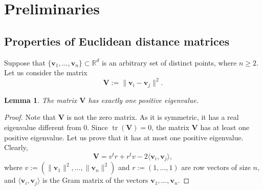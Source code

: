 \documentclass[a4paper, oneside, reqno, 12pt]{amsart}
\theoremstyle{plain}
\newtheorem{lemma}[theorem]{Lemma}
\theoremstyle{definition}
\DeclareMathOperator{\tr}{tr}
\begin{document}
\section{Preliminaries}
\label{section:preliminaries}
\subsection{Properties of Euclidean distance matrices}
Suppose that $\{\mathbf v_1, \dots, \mathbf v_n\}\subset \mathbb R^d$ is an arbitrary set of distinct points, where $n\geq 2$. Let us consider the matrix 
\[
\mathbf V:=\|\mathbf v_i-\mathbf v_j\|^2.
\]
\begin{lemma} \label{lemma:matrixV}
The matrix $\mathbf V$ has exactly one positive eigenvalue.
\end{lemma}
\begin{proof}
Note that $\mathbf V$ is not the zero matrix. As it is symmetric, it has a real eigenvalue different from $0$. Since $\tr(\mathbf V)=0$, the matrix $\mathbf V$ has at least one positive eigenvalue. Let us prove that it has at most one positive eigenvalue. Clearly,
\[
\label{equation:e1}\mathbf V=v^t r+r^t v-2\langle \mathbf v_i, \mathbf v_j\rangle,
\]
where $v:=(\|\mathbf v_1\|^2, \dots, \|\mathbf v_n\|^2)$ and $r:=(1,\dots, 1)$ are row vectors of size $n$, and $\langle \mathbf v_i,\mathbf v_j\rangle$ is the Gram matrix of the vectors $\mathbf v_1,\dots, \mathbf v_n$. 


\end{proof}
\end{document}

